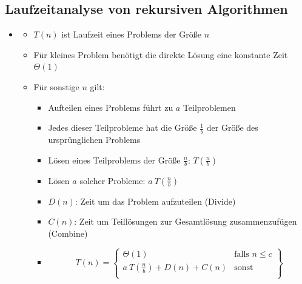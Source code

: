 \documentclass[
    ngerman,
    color=3b,
    load_common, %
    summary,
    boxarc,
]{tuda_summary}
\begin{document}
\subsection{Laufzeitanalyse von rekursiven Algorithmen}\label{Laufzeit rekursive Algorithmen}
\begin{itemize}
    \item {}
          \begin{itemize}
              \item $T(n)$ ist Laufzeit eines Problems der Größe $n$
              \item Für kleines Problem benötigt die direkte Lösung eine konstante Zeit $\Theta(1)$
              \item Für sonstige $n$ gilt:
                    \begin{itemize}
                        \item Aufteilen eines Problems führt zu $a$ Teilproblemen
                        \item Jedes dieser Teilprobleme hat die Größe $\frac{1}{b}$ der Größe des ursprünglichen Problems
                        \item Lösen eines Teilproblems der Größe $\frac{n}{b}$: $T(\frac{n}{b})$
                        \item Lösen $a$ solcher Probleme: $a~T(\frac{n}{b})$
                        \item $D(n)$: Zeit um das Problem aufzuteilen (Divide)
                        \item $C(n)$: Zeit um Teillösungen zur Gesamtlösung zusammenzufügen (Combine)
                        \item[] \[
                                  T(n) = \left.
                                  \begin{cases}
                                      \Theta(1)                      & \text{falls } n \leq c \\
                                      a~T(\frac{n}{b}) + D(n) + C(n) & \text{sonst}           \\
                                  \end{cases}
                                  \right \}
                              \]
                    \end{itemize}
          \end{itemize}


\end{itemize}
\end{document}
